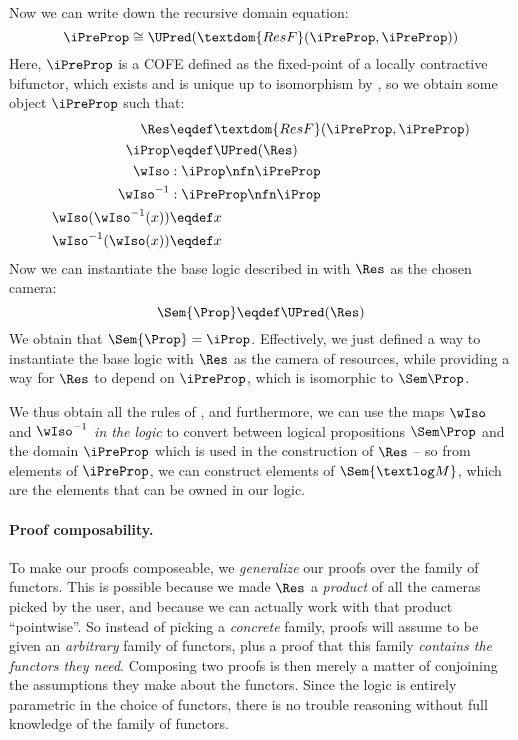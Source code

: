 Now we can write down the recursive domain equation:
\[ \iPreProp \cong \UPred(\textdom{ResF}(\iPreProp, \iPreProp)) \]
Here, $\iPreProp$ is a COFE defined as the fixed-point of a locally contractive bifunctor, which exists and is unique up to isomorphism by , so we obtain some object $\iPreProp$ such that:
\begin{align*}
  \Res &\eqdef \textdom{ResF}(\iPreProp, \iPreProp) \\
  \iProp &\eqdef \UPred(\Res) \\
	\wIso &: \iProp \nfn \iPreProp \\
	\wIso^{-1} &: \iPreProp \nfn \iProp \\
  \wIso(\wIso^{-1}(x)) &\eqdef x \\
  \wIso^{-1}(\wIso(x)) &\eqdef x
\end{align*}
Now we can instantiate the base logic described in  with $\Res$ as the chosen camera:
\[ \Sem{\Prop} \eqdef \UPred(\Res) \]
We obtain that $\Sem{\Prop} = \iProp$.
Effectively, we just defined a way to instantiate the base logic with $\Res$ as the camera of resources, while providing a way for $\Res$ to depend on $\iPreProp$, which is isomorphic to $\Sem\Prop$.

We thus obtain all the rules of , and furthermore, we can use the maps $\wIso$ and $\wIso^{-1}$ \emph{in the logic} to convert between logical propositions $\Sem\Prop$ and the domain $\iPreProp$ which is used in the construction of $\Res$ -- so from elements of $\iPreProp$, we can construct elements of $\Sem{\textlog M}$, which are the elements that can be owned in our logic.

\paragraph{Proof composability.}
To make our proofs composeable, we \emph{generalize} our proofs over the family of functors.
This is possible because we made $\Res$ a \emph{product} of all the cameras picked by the user, and because we can actually work with that product ``pointwise''.
So instead of picking a \emph{concrete} family, proofs will assume to be given an \emph{arbitrary} family of functors, plus a proof that this family \emph{contains the functors they need}.
Composing two proofs is then merely a matter of conjoining the assumptions they make about the functors.
Since the logic is entirely parametric in the choice of functors, there is no trouble reasoning without full knowledge of the family of functors.

